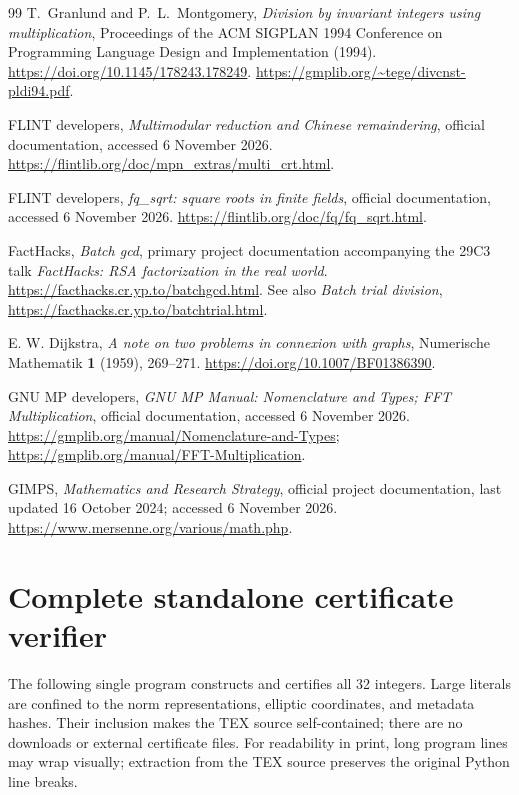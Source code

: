 \documentclass[11pt,a4paper]{article}
\theoremstyle{definition}\newtheorem{definition}[theorem]{Definition}
\theoremstyle{remark}\newtheorem{remark}[theorem]{Remark}
\begin{document}
\begin{thebibliography}{99}
T.~Granlund and P.~L.~Montgomery,
\emph{Division by invariant integers using multiplication},
Proceedings of the ACM SIGPLAN 1994 Conference on Programming Language
Design and Implementation (1994).
\url{https://doi.org/10.1145/178243.178249}.
\url{https://gmplib.org/~tege/divcnst-pldi94.pdf}.

FLINT developers, \emph{Multimodular reduction and Chinese remaindering},
official documentation, accessed 6 November 2026.
\url{https://flintlib.org/doc/mpn_extras/multi_crt.html}.

FLINT developers, \emph{fq\_sqrt: square roots in finite fields},
official documentation, accessed 6 November 2026.
\url{https://flintlib.org/doc/fq/fq_sqrt.html}.


FactHacks, \emph{Batch gcd}, primary project documentation accompanying
the 29C3 talk \emph{FactHacks: RSA factorization in the real world}.
\url{https://facthacks.cr.yp.to/batchgcd.html}.
See also \emph{Batch trial division},
\url{https://facthacks.cr.yp.to/batchtrial.html}.

E. W. Dijkstra, \emph{A note on two problems in connexion with graphs},
Numerische Mathematik \textbf{1} (1959), 269--271.
\url{https://doi.org/10.1007/BF01386390}.


GNU MP developers, \emph{GNU MP Manual: Nomenclature and Types;
FFT Multiplication}, official documentation, accessed 6 November 2026.
\url{https://gmplib.org/manual/Nomenclature-and-Types};
\url{https://gmplib.org/manual/FFT-Multiplication}.

GIMPS, \emph{Mathematics and Research Strategy}, official project
documentation, last updated 16 October 2024; accessed 6 November 2026.
\url{https://www.mersenne.org/various/math.php}.

\end{thebibliography}

\clearpage
\appendix
\section{Complete standalone certificate verifier}
\label{app:code}

The following single program constructs and certifies all 32 integers.
Large literals are confined to the norm representations, elliptic coordinates,
and metadata hashes. Their inclusion makes the TEX source self-contained;
there are no downloads or external certificate files. For readability in
print, long program lines may wrap visually; extraction from the TEX source
preserves the original Python line breaks.
\end{document}
